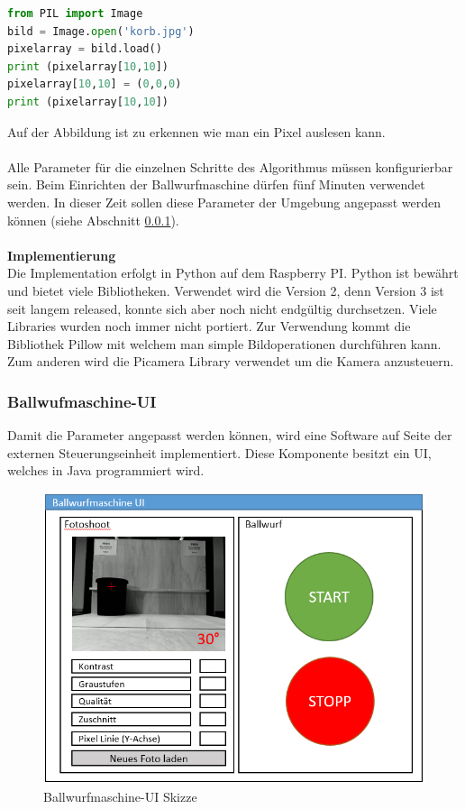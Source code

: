 \begin{lstlisting}[language=Python]
from PIL import Image
bild = Image.open('korb.jpg')
pixelarray = bild.load()
print (pixelarray[10,10])
pixelarray[10,10] = (0,0,0)
print (pixelarray[10,10])
\end{lstlisting}

Auf der Abbildung ist zu erkennen wie man ein Pixel auslesen kann.\\
\\
Alle Parameter für die einzelnen Schritte des Algorithmus müssen konfigurierbar sein. Beim Einrichten der Ballwurfmaschine dürfen fünf Minuten verwendet werden. In dieser Zeit sollen diese Parameter der Umgebung angepasst werden können (siehe Abschnitt \ref{ss-config-paramater-ortung-orb}).\\
\\
\textbf{Implementierung}\\
Die Implementation erfolgt in Python auf dem Raspberry PI. Python ist bewährt und bietet viele Bibliotheken. Verwendet wird die Version 2, denn Version 3 ist seit langem released, konnte sich aber noch nicht endgültig durchsetzen. Viele Libraries wurden noch immer nicht portiert. Zur Verwendung kommt die Bibliothek Pillow mit welchem man simple Bildoperationen durchführen kann. Zum anderen wird die Picamera Library verwendet um die Kamera anzusteuern.

\subsubsection{Ballwufmaschine-UI}
\label{ss-config-paramater-ortung-orb}
Damit die Parameter angepasst werden können, wird eine Software auf Seite der externen Steuerungseinheit implementiert. Diese Komponente besitzt ein UI, welches in Java programmiert wird.

\begin{figure}[h!]
	\centering
	\includegraphics[scale=0.75]{../../fig/fotoshoot-configurator.png}
	\caption{Ballwurfmaschine-UI Skizze}
\end{figure}

